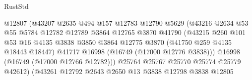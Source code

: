 \begin{lexlean}{RustStd}
\begin{coremodule}
                                        @12807
                                        (@43207
                                          @2635
                                          @494
                                          @157
                                          @12783
                                          @12790
                                          @5629
                                          (@43216
                                            @2634
                                            @53
                                            @55
                                            @5784
                                            @12782
                                            @12789
                                            @3864
                                            @12765
                                            @3870
                                            @41790
                                            (@43215
                                              @260
                                              @101
                                              @53
                                              @16
                                              @4135
                                              @3838
                                              @3850
                                              @3864
                                              @12775
                                              @3870
                                              (@41750 @259 @4135 @18443 @18447)
                                              @41717
                                              @16998
                                              (@16749 (@17000 @12776 @3838)))
                                            @16998
                                            (@16749 (@17000 @12766 @12782)))
                                          @25764
                                          @25767
                                          @25770
                                          @25774
                                          @25779
                                          @42612)
                                        (@43261
                                          @12792
                                          @2643
                                          @2650
                                          @13
                                          @3838
                                          @12798
                                          @3838
                                          @12805

\end{coremodule}
\end{lexlean}
